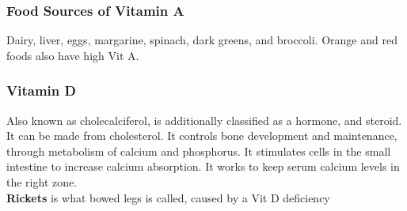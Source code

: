 \documentclass[letterpaper, 11pt]{article}
\begin{document}
\subsubsection{Food Sources of Vitamin A}
\label{sec:orgd52ea0a}
Dairy, liver, eggs, margarine, spinach, dark greens, and broccoli. Orange and red foods also have high Vit A.\\
\subsubsection{Vitamin D}
\label{sec:orgf3c0ed7}
Also known as cholecalciferol, is additionally classified as a hormone, and steroid. It can be made from cholesterol. It controls bone development and maintenance, through metabolism of calcium and phosphorus. It stimulates cells in the small intestine to increase calcium absorption. It works to keep serum calcium levels in the right zone.\\
\textbf{Rickets} is what bowed legs is called, caused by a Vit D deficiency
\end{document}
